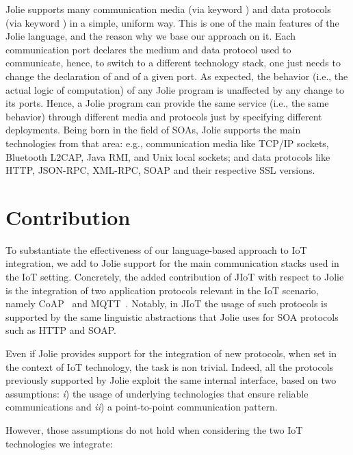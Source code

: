 Jolie supports many communication media (via keyword ) and data
protocols (via keyword ) in a simple, uniform way. This is one of
the main features of the Jolie language, and the reason why we base our approach
on it.
%
Each communication port declares the medium and data protocol used to
communicate, hence, to switch to a different technology stack, one just needs to
change the declaration of  and  of a given port.
As expected, the behavior (i.e., the actual logic of computation) of any Jolie
program is unaffected by any change to its ports. Hence, a Jolie program can
provide the same service (i.e., the same behavior) through different media and
protocols just by specifying different deployments. Being born in the field of
SOAs, Jolie supports the main technologies from that area: e.g., communication
media like TCP/IP sockets, Bluetooth L2CAP, Java RMI, and Unix local sockets;
and data protocols like HTTP, JSON-RPC, XML-RPC, SOAP and their respective SSL
versions.

\section{Contribution}
\label{sec:contribution}

To substantiate the effectiveness of our language-based approach to IoT
integration, we add to Jolie support for the main communication stacks used in
the IoT setting. Concretely, the added contribution of JIoT with respect to
Jolie is the integration of two application protocols relevant in the IoT
scenario, namely CoAP~\cite{doi:10.17487/RFC7252,coap} and
MQTT~\cite{mqtt-v3.1.1,mqtt}. Notably, in JIoT the usage of such protocols is
supported by the same linguistic abstractions that Jolie uses for SOA protocols
such as HTTP and SOAP.

Even if Jolie provides support for the integration of new protocols, when set in
the context of IoT technology, the task is non trivial. Indeed, all the
protocols previously supported by Jolie exploit the same internal interface,
based on two assumptions: \emph{i}) the usage of underlying technologies that
ensure reliable communications and \emph{ii}) a point-to-point communication
pattern.

However, those assumptions do not hold when considering the two IoT technologies
we integrate:

